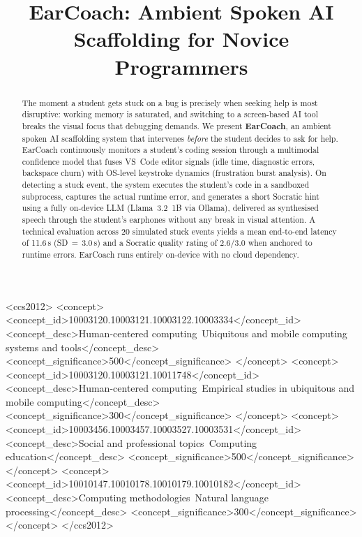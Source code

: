 \documentclass[sigconf,anonymous,review]{acmart}
\begin{document}
\title{EarCoach: Ambient Spoken AI Scaffolding for Novice Programmers}

\begin{abstract}
The moment a student gets stuck on a bug is precisely when seeking help
is most disruptive: working memory is saturated, and switching to a
screen-based AI tool breaks the visual focus that debugging demands.
We present \textbf{EarCoach}, an ambient spoken AI scaffolding system
that intervenes \emph{before} the student decides to ask for help.
EarCoach continuously monitors a student's coding session through a
multimodal confidence model that fuses VS~Code editor signals (idle
time, diagnostic errors, backspace churn) with OS-level keystroke
dynamics (frustration burst analysis). On detecting a stuck event, the
system executes the student's code in a sandboxed subprocess, captures
the actual runtime error, and generates a short Socratic hint using a
fully on-device LLM (Llama~3.2~1B via Ollama), delivered as synthesised
speech through the student's earphones without any break in visual
attention. A technical evaluation across 20 simulated stuck events yields
a mean end-to-end latency of 11.6\,s (SD\,$=$\,3.0\,s) and a Socratic
quality rating of 2.6/3.0 when anchored to runtime errors. EarCoach runs
entirely on-device with no cloud dependency.
\end{abstract}

\begin{CCSXML}
<ccs2012>
   <concept>
       <concept_id>10003120.10003121.10003122.10003334</concept_id>
       <concept_desc>Human-centered computing~Ubiquitous and mobile computing systems and tools</concept_desc>
       <concept_significance>500</concept_significance>
   </concept>
   <concept>
       <concept_id>10003120.10003121.10011748</concept_id>
       <concept_desc>Human-centered computing~Empirical studies in ubiquitous and mobile computing</concept_desc>
       <concept_significance>300</concept_significance>
   </concept>
   <concept>
       <concept_id>10003456.10003457.10003527.10003531</concept_id>
       <concept_desc>Social and professional topics~Computing education</concept_desc>
       <concept_significance>500</concept_significance>
   </concept>
   <concept>
       <concept_id>10010147.10010178.10010179.10010182</concept_id>
       <concept_desc>Computing methodologies~Natural language processing</concept_desc>
       <concept_significance>300</concept_significance>
   </concept>
</ccs2012>
\end{CCSXML}

\end{document}
